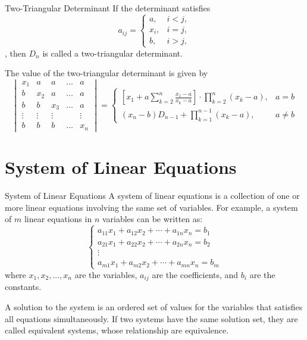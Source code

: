 \documentclass[11pt]{../../TexTemplate/elegantbook} %
\begin{document}
\begin{definition}{Two-Triangular Determinant}
    If the determinant satisfies 
    \[ 
    a_{ij} = \begin{cases} 
    a, & i < j, \\ 
    x_{i}, & i = j, \\ 
    b, & i > j,
    \end{cases} 
    \], 
    then \( D_{n} \) is called a two-triangular determinant.
\end{definition}

The value of the two-triangular determinant is given by
\[
\begin{vmatrix}
x_{1} & a & a & \dots & a \\
b & x_{2} & a & \dots & a \\
b & b & x_{3} & \dots & a \\
\vdots & \vdots & \vdots & & \vdots \\
b & b & b & \dots & x_{n}
\end{vmatrix}
=
\begin{cases}
\left[ x_{1} + a \sum\limits^{n}_{k=2} \frac{x_{1}-a}{x_{k}-a} \right] \cdot \prod\limits^{n}_{k=2} (x_{k}-a), & a = b \\
(x_{n}-b) D_{n-1} + \prod\limits^{n-1}_{k=1} (x_{k}-a), & a \neq b 
\end{cases}
\]


\chapter{System of Linear Equations}
\begin{definition}{System of Linear Equations}
    A system of linear equations is a collection of one or more linear equations involving the same set of variables. 
    For example, a system of \( m \) linear equations in \( n \) variables can be written as:
    \[
    \begin{cases}
    a_{11}x_1 + a_{12}x_2 + \cdots + a_{1n}x_n = b_1 \\
    a_{21}x_1 + a_{22}x_2 + \cdots + a_{2n}x_n = b_2 \\
    \vdots \\
    a_{m1}x_1 + a_{m2}x_2 + \cdots + a_{mn}x_n = b_m
    \end{cases}
    \]
    where \( x_1, x_2, \ldots, x_n \) are the variables, \( a_{ij} \) are the coefficients, and \( b_i \) are the constants.

    A solution to the system is an ordered set of values for the variables that satisfies all equations simultaneously.
    If two systems have the same solution set, they are called equivalent systems, 
    whose relationship are equivalence.
\end{definition}
\end{document}
